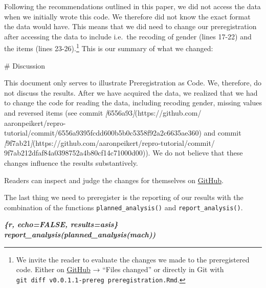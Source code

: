 \documentclass[psych,tutorial,submit,moreauthors,pdftex]{mdpi}
\newenvironment{Shaded}{\begin{snugshade}}{\end{snugshade}}
\newcommand{\CommentTok}[1]{\textcolor[rgb]{0.56,0.35,0.01}{\textit{#1}}}
\newcommand{\FunctionTok}[1]{\textcolor[rgb]{0.00,0.00,0.00}{#1}}
\newcommand{\InformationTok}[1]{\textcolor[rgb]{0.56,0.35,0.01}{\textbf{\textit{#1}}}}
\newcommand{\NormalTok}[1]{#1}
\newcommand{\OtherTok}[1]{\textcolor[rgb]{0.56,0.35,0.01}{#1}}
\begin{document}
Following the recommendations outlined in this paper, we did not access
the data when we initially wrote this code. We therefore did not know
the exact format the data would have. This means that we did need to
change our preregistration after accessing the data to include i.e.~the
recoding of gender (lines 17-22) and the items (lines 23-26).\footnote{We
  invite the reader to evaluate the changes we made to the preregistered
  code. Either on
  \href{https://github.com/aaronpeikert/repro-tutorial/compare/v0.0.1.1-prereg...main}{GitHub}
  → ``Files changed'' or directly in Git with
  \texttt{git\ diff\ v0.0.1.1-prereg\ preregistration.Rmd}.} This is our
summary of what we changed:

\begin{Shaded}
\begin{Highlighting}[]
\FunctionTok{\# Discussion}

\NormalTok{This document only serves to illustrate Preregistration as Code. We, therefore,}
\NormalTok{do not discuss the results. After we have acquired the data, we realized that}
\NormalTok{we had to change the code for reading the data, including recoding gender,}
\NormalTok{missing values and reversed items (see commit }\CommentTok{[}\OtherTok{6556a93}\CommentTok{]}\NormalTok{(https://github.com/}
\NormalTok{aaronpeikert/repro{-}tutorial/commit/6556a9395fcdd600b5b0c5358f92a2c6635ae360)}
\NormalTok{and commit }\CommentTok{[}\OtherTok{9f7ab21}\CommentTok{]}\NormalTok{(https://github.com/aaronpeikert/repro{-}tutorial/commit/}
\NormalTok{9f7ab212dfaf84a0398752a4b80cf14c71000d00)). We do not believe that these changes}
\NormalTok{influence the results substantively.}
\end{Highlighting}
\end{Shaded}

Readers can inspect and judge the changes for themselves on
\href{https://github.com/aaronpeikert/repro-tutorial/compare/v0.0.1.1-prereg..main\#diff-e21a8fa2e44b297dfefef329a6ef56d283488d467c4b4ffe2a014111e52a170b}{GitHub}.

The last thing we need to preregister is the reporting of our results
with the combination of the functions \texttt{planned\_analysis()} and
\texttt{report\_analysis()}.

\begin{Shaded}
\begin{Highlighting}[]
\InformationTok{\textasciigrave{}\textasciigrave{}\textasciigrave{}\{r, echo=FALSE, results=\textquotesingle{}asis\textquotesingle{}\}}
\InformationTok{report\_analysis(planned\_analysis(mach))}
\InformationTok{\textasciigrave{}\textasciigrave{}\textasciigrave{}}
\end{Highlighting}
\end{Shaded}
\end{document}
